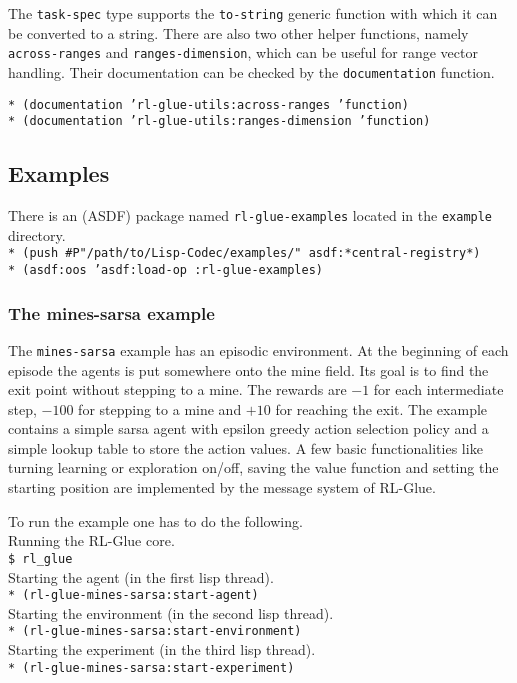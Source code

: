 \documentclass[11pt,a4paper,dvipdfm]{article}
\newcommand{\prompttext}[1]{\texttt{#1}}
\newcommand{\shprompt}[1]{\prompttext{\$ #1}}
\newcommand{\lispprompt}[1]{\prompttext{* #1}}
\begin{document}
The \prompttext{task-spec} type supports the \prompttext{to-string} generic
function with which it can be converted to a string. There are also two other
helper functions, namely \prompttext{across-ranges} and
\prompttext{ranges-dimension}, which can be useful for range vector handling.
Their documentation can be checked by the \prompttext{documentation} function.

\lispprompt{(documentation 'rl-glue-utils:across-ranges 'function)} \\
\lispprompt{(documentation 'rl-glue-utils:ranges-dimension 'function)}

\hypertarget{examples}{\subsection{Examples}}

There is an (ASDF) package named \prompttext{rl-glue-examples} located
in the \prompttext{example} directory. \\
\lispprompt{(push \#P"/path/to/Lisp-Codec/examples/" asdf:*central-registry*)} \\
\lispprompt{(asdf:oos 'asdf:load-op :rl-glue-examples)}

\subsubsection{The mines-sarsa example}

The \prompttext{mines-sarsa} example has an episodic environment. At the
beginning of each episode the agents is put somewhere onto the mine field.
Its goal is to find the exit point without stepping to a mine. The rewards
are $-1$ for each intermediate step, $-100$ for stepping to a mine and $+10$
for reaching the exit. The example contains a simple sarsa agent with epsilon
greedy action selection policy and a simple lookup table to store the action
values. A few basic functionalities like turning learning or exploration on/off,
saving the value function and setting the starting position are implemented by
the message system of RL-Glue.

To run the example one has to do the following. \\
Running the RL-Glue core. \\
\shprompt{rl\_glue} \\
Starting the agent (in the first lisp thread). \\
\lispprompt{(rl-glue-mines-sarsa:start-agent)} \\
Starting the environment (in the second lisp thread). \\
\lispprompt{(rl-glue-mines-sarsa:start-environment)} \\
Starting the experiment (in the third lisp thread). \\
\lispprompt{(rl-glue-mines-sarsa:start-experiment)}
\end{document}

